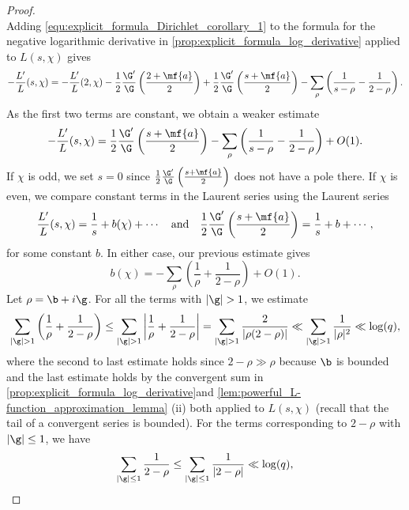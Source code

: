 \begin{proof}
\begin{equation}
      \end{equation}
      Adding \cref{equ:explicit_formula_Dirichlet_corollary_1} to the formula for the negative logarithmic derivative in \cref{prop:explicit_formula_log_derivative} applied to \(L(s,\chi)\) gives
      \[
        -\frac{L'}{L}(s,\chi) = -\frac{L'}{L}(2,\chi)-\frac{1}{2}\frac{\G'}{\G}\left(\frac{2+\mf{a}}{2}\right)+\frac{1}{2}\frac{\G'}{\G}\left(\frac{s+\mf{a}}{2}\right)-\sum_{\rho}\left(\frac{1}{s-\rho}-\frac{1}{2-\rho}\right).
      \]
      As the first two terms are constant, we obtain a weaker estimate
      \[
        -\frac{L'}{L}(s,\chi) = \frac{1}{2}\frac{\G'}{\G}\left(\frac{s+\mf{a}}{2}\right)-\sum_{\rho}\left(\frac{1}{s-\rho}-\frac{1}{2-\rho}\right)+O(1).
      \]
      If \(\chi\) is odd, we set \(s = 0\) since \(\frac{1}{2}\frac{\G'}{\G}\left(\frac{s+\mf{a}}{2}\right)\) does not have a pole there. If \(\chi\) is even, we compare constant terms in the Laurent series using the Laurent series
      \[
        \frac{L'}{L}(s,\chi) = \frac{1}{s}+b(\chi)+\cdots \quad \text{and} \quad \frac{1}{2}\frac{\G'}{\G}\left(\frac{s+\mf{a}}{2}\right) = \frac{1}{s}+b+\cdots,
      \]
      for some constant \(b\). In either case, our previous estimate gives
      \begin{equation}\label{equ:explicit_formula_Dirichlet_corollary_2}
        b(\chi) = -\sum_{\rho}\left(\frac{1}{\rho}+\frac{1}{2-\rho}\right)+O(1).
      \end{equation}
      Let \(\rho = \b+i\g\). For all the terms with \(|\g| > 1\), we estimate
      \begin{equation}\label{equ:explicit_formula_Dirichlet_corollary_3}
        \sum_{|\g| > 1}\left(\frac{1}{\rho}+\frac{1}{2-\rho}\right) \le \sum_{|\g| > 1}\left|\frac{1}{\rho}+\frac{1}{2-\rho}\right| = \sum_{|\g| > 1}\frac{2}{|\rho(2-\rho)|} \ll \sum_{|\g| > 1}\frac{1}{|\rho|^{2}} \ll \log(q),
      \end{equation}
      where the second to last estimate holds since \(2-\rho \gg \rho\) because \(\b\) is bounded and the last estimate holds by the convergent sum in \cref{prop:explicit_formula_log_derivative}and \cref{lem:powerful_L-function_approximation_lemma} (ii) both applied to \(L(s,\chi)\) (recall that the tail of a convergent series is bounded). For the terms corresponding to \(2-\rho\) with \(|\g| \le 1\), we have
      \begin{equation}\label{equ:explicit_formula_Dirichlet_corollary_4}
        \sum_{|\g| \le 1}\frac{1}{2-\rho} \le \sum_{|\g| \le 1}\frac{1}{|2-\rho|} \ll \log(q),
      \end{equation}

\end{proof}
